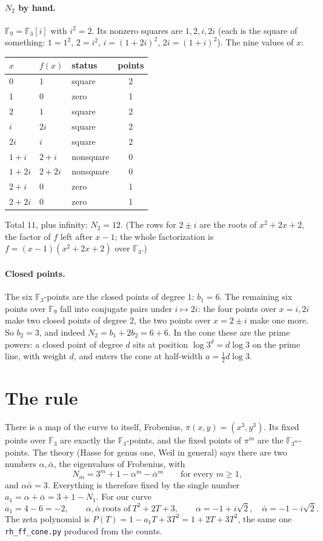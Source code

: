 \documentclass[11pt]{article}
\newcommand{\F}{\mathbb F}
\newcommand{\abar}{\bar\alpha}
\begin{document}
\paragraph{$N_2$ by hand.} $\F_9=\F_3[i]$ with $i^2=2$. Its nonzero squares are $1,2,i,2i$ (each is the square of something: $1=1^2$, $2=i^2$, $i=(1+2i)^2$, $2i=(1+i)^2$). The nine values of $x$:
\begin{center}
\begin{tabular}{lllc}
\toprule
$x$ & $f(x)$ & status & points \\
\midrule
$0$ & $1$ & square & 2\\
$1$ & $0$ & zero & 1\\
$2$ & $1$ & square & 2\\
$i$ & $2i$ & square & 2\\
$2i$ & $i$ & square & 2\\
$1+i$ & $2+i$ & nonsquare & 0\\
$1+2i$ & $2+2i$ & nonsquare & 0\\
$2+i$ & $0$ & zero & 1\\
$2+2i$ & $0$ & zero & 1\\
\bottomrule
\end{tabular}
\end{center}
Total $11$, plus infinity: $N_2=12$. (The rows for $2\pm i$ are the roots of $x^2+2x+2$, the factor of $f$ left after $x-1$; the whole factorization is $f=(x-1)(x^2+2x+2)$ over $\F_3$.)

\paragraph{Closed points.} The six $\F_3$-points are the closed points of degree $1$: $b_1=6$. The remaining six points over $\F_9$ fall into conjugate pairs under $i\mapsto2i$: the four points over $x=i,2i$ make two closed points of degree $2$, the two points over $x=2\pm i$ make one more. So $b_2=3$, and indeed $N_2=b_1+2b_2=6+6$. In the cone these are the prime powers: a closed point of degree $d$ sits at position $\log 3^d=d\log3$ on the prime line, with weight $d$, and enters the cone at half-width $a=\tfrac12 d\log 3$.

\section{The rule}

There is a map of the curve to itself, Frobenius, $\pi(x,y)=(x^3,y^3)$. Its fixed points over $\overline{\F}_3$ are exactly the $\F_3$-points, and the fixed points of $\pi^m$ are the $\F_{3^m}$-points. The theory (Hasse for genus one, Weil in general) says there are two numbers $\alpha,\abar$, the eigenvalues of Frobenius, with
\begin{equation}\label{eq:rule}
N_m=3^m+1-\alpha^m-\abar^m\qquad\text{for every }m\geq1,
\end{equation}
and $\alpha\abar=3$. Everything is therefore fixed by the single number $a_1=\alpha+\abar=3+1-N_1$. For our curve
\[
a_1=4-6=-2,\qquad \alpha,\abar\ \text{roots of}\ T^2+2T+3,\qquad \alpha=-1+i\sqrt2,\quad\abar=-1-i\sqrt2 .
\]
The zeta polynomial is $P(T)=1-a_1T+3T^2=1+2T+3T^2$, the same one \texttt{rh\_ff\_cone.py} produced from the counts.
\end{document}
